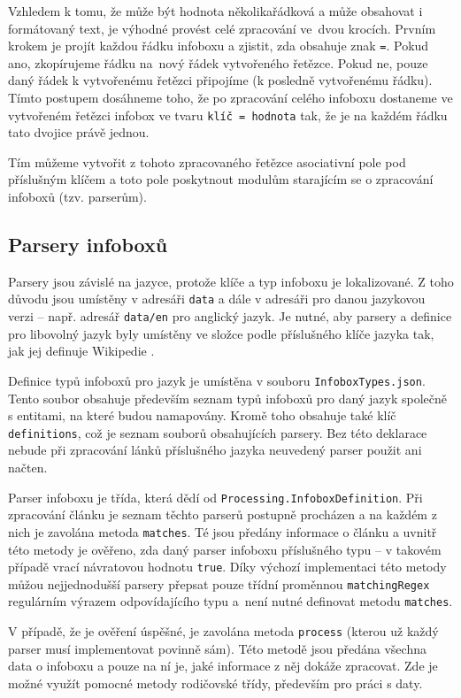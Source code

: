 Vzhledem k tomu, že může být hodnota několikařádková a může obsahovat i formátovaný text, je výhodné provést celé zpracování ve~dvou krocích. Prvním krokem je projít každou řádku infoboxu a zjistit, zda obsahuje znak \texttt{=}. Pokud ano, zkopírujeme řádku na~nový řádek vytvořeného řetězce. Pokud ne, pouze daný řádek k vytvořenému řetězci připojíme (k posledně vytvořenému řádku). Tímto postupem dosáhneme toho, že po zpracování celého infoboxu dostaneme ve vytvořeném řetězci infobox ve tvaru \texttt{klíč = hodnota} tak, že je na každém řádku tato dvojice právě jednou.

Tím můžeme vytvořit z tohoto zpracovaného řetězce asociativní pole pod příslušným klíčem a toto pole poskytnout modulům starajícím se o zpracování infoboxů (tzv. parserům).

\subsection{Parsery infoboxů}
Parsery jsou závislé na jazyce, protože klíče a typ infoboxu je lokalizované. Z toho důvodu jsou umístěny v adresáři \texttt{data} a dále v adresáři pro danou jazykovou verzi -- např. adresář \texttt{data/en} pro anglický jazyk. Je nutné, aby parsery a definice pro libovolný jazyk byly umístěny ve složce podle příslušného klíče jazyka tak, jak jej definuje Wikipedie \cite{listofwikis}.

Definice typů infoboxů pro jazyk je umístěna v souboru \texttt{InfoboxTypes.json}. Tento soubor obsahuje především seznam typů infoboxů pro daný jazyk společně s entitami, na které budou namapovány. Kromě toho obsahuje také klíč \texttt{definitions}, což je seznam souborů obsahujících parsery. Bez této deklarace nebude při zpracování lánků příslušného jazyka neuvedený parser použit ani načten.

Parser infoboxu je třída, která dědí od \texttt{Processing.InfoboxDefinition}. Při zpracování článku je seznam těchto parserů postupně procházen a na každém z nich je zavolána metoda \texttt{matches}. Té jsou předány informace o článku a uvnitř této metody je ověřeno, zda daný parser  infoboxu příslušného typu -- v takovém případě vrací návratovou hodnotu \texttt{true}. Díky výchozí implementaci této metody můžou nejjednodušší parsery přepsat pouze třídní proměnnou \texttt{matchingRegex} regulárním výrazem odpovídajícího typu a~není nutné definovat metodu \texttt{matches}.

V případě, že je ověření úspěšné, je zavolána metoda \texttt{process} (kterou už každý parser musí implementovat povinně sám). Této metodě jsou předána všechna data o infoboxu a pouze na ní je, jaké informace z něj dokáže zpracovat. Zde je možné využít pomocné metody rodičovské třídy, především pro práci s daty.

